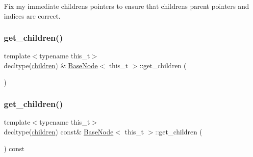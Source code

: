 Fix my immediate children\textquotesingle{}s pointers to ensure that children\textquotesingle{}s parent pointers and indices are correct.\mbox{\label{class_base_node_a7177763ffa8b3e658124c586dde30be9}} 
\subsubsection{\texorpdfstring{get\+\_\+children()}{get\_children()}\hspace{0.1cm}{\footnotesize\ttfamily [1/2]}}
{\footnotesize\ttfamily template$<$typename this\+\_\+t$>$ \\
decltype(\hyperlink{class_base_node_af2f245862083d173c950fca048c03546}{children}) \& \hyperlink{class_base_node}{Base\+Node}$<$ this\+\_\+t $>$\+::get\+\_\+children (\begin{DoxyParamCaption}{ }\end{DoxyParamCaption})\hspace{0.3cm}{\ttfamily [inline]}}

\mbox{\label{class_base_node_aec98c1640e03a27d1663f876bc49ef69}} 
\subsubsection{\texorpdfstring{get\+\_\+children()}{get\_children()}\hspace{0.1cm}{\footnotesize\ttfamily [2/2]}}
{\footnotesize\ttfamily template$<$typename this\+\_\+t$>$ \\
decltype(\hyperlink{class_base_node_af2f245862083d173c950fca048c03546}{children}) const\& \hyperlink{class_base_node}{Base\+Node}$<$ this\+\_\+t $>$\+::get\+\_\+children (\begin{DoxyParamCaption}{ }\end{DoxyParamCaption}) const\hspace{0.3cm}{\ttfamily [inline]}}

\mbox{\label{class_base_node_a1e4560f882d4cdb713aea5178a4e2d86}} 
